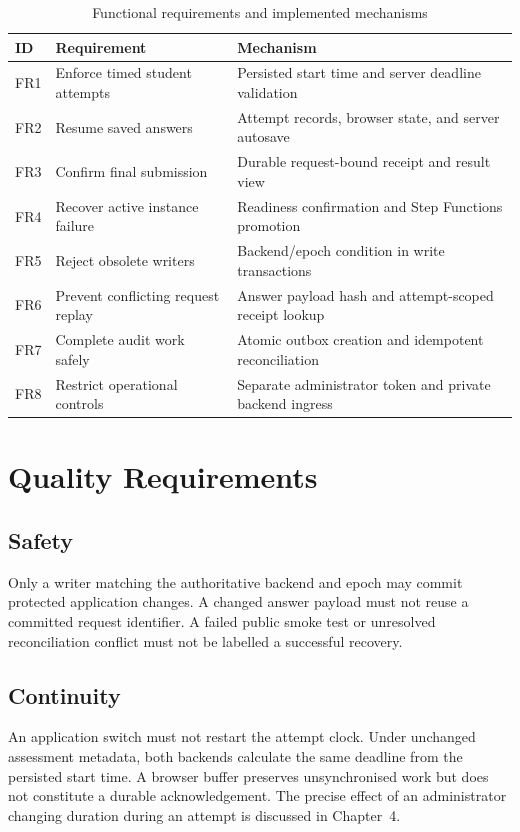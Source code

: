 \begin{table}[H]\centering\small
\caption{Functional requirements and implemented mechanisms}\label{tab:requirements}
\begin{tabularx}{\textwidth}{@{}L{13mm}L{48mm}Y@{}}\toprule
\textbf{ID} & \textbf{Requirement} & \textbf{Mechanism}\\\midrule
FR1 & Enforce timed student attempts & Persisted start time and server deadline validation\\
FR2 & Resume saved answers & Attempt records, browser state, and server autosave\\
FR3 & Confirm final submission & Durable request-bound receipt and result view\\
FR4 & Recover active instance failure & Readiness confirmation and Step Functions promotion\\
FR5 & Reject obsolete writers & Backend/epoch condition in write transactions\\
FR6 & Prevent conflicting request replay & Answer payload hash and attempt-scoped receipt lookup\\
FR7 & Complete audit work safely & Atomic outbox creation and idempotent reconciliation\\
FR8 & Restrict operational controls & Separate administrator token and private backend ingress\\\bottomrule
\end{tabularx}\end{table}

\FloatBarrier

\section{Quality Requirements}
\subsection{Safety}
Only a writer matching the authoritative backend and epoch may commit protected application changes. A changed answer payload must not reuse a committed request identifier. A failed public smoke test or unresolved reconciliation conflict must not be labelled a successful recovery.
\subsection{Continuity}
An application switch must not restart the attempt clock. Under unchanged assessment metadata, both backends calculate the same deadline from the persisted start time. A browser buffer preserves unsynchronised work but does not constitute a durable acknowledgement. The precise effect of an administrator changing duration during an attempt is discussed in Chapter~4.
